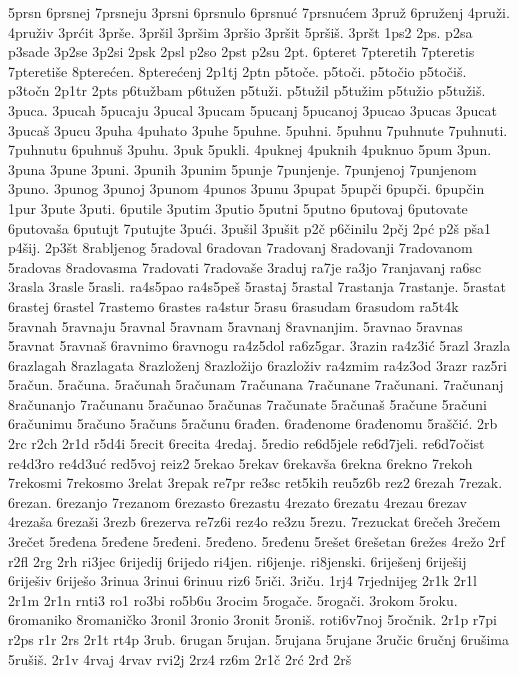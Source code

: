 {5prsn
6prsnej
7prsneju
3prsni
6prsnulo
6prsnuć
7prsnućem
3pruž
6pruženj
4pruži.
4pruživ
3prćit
3prše.
3pršil
3pršim
3pršio
3pršit
5pršiš.
3pršt
1ps2
2ps.
p2sa
p3sade
3p2se
3p2si
2psk
2psl
p2so
2pst
p2su
2pt.
6pteret
7pteretih
7pteretis
7pteretiše
8pterećen.
8pterećenj
2p1tj
2ptn
p5toče.
p5toči.
p5točio
p5točiš.
p3točn
2p1tr
2pts
p6tužbam
p6tužen
p5tuži.
p5tužil
p5tužim
p5tužio
p5tužiš.
3puca.
3pucah
5pucaju
3pucal
3pucam
5pucanj
5pucanoj
3pucao
3pucas
3pucat
3pucaš
3pucu
3puha
4puhato
3puhe
5puhne.
5puhni.
5puhnu
7puhnute
7puhnuti.
7puhnutu
6puhnuš
3puhu.
3puk
5pukli.
4puknej
4puknih
4puknuo
5pum
3pun.
3puna
3pune
3puni.
3punih
3punim
5punje
7punjenje.
7punjenoj
7punjenom
3puno.
3punog
3punoj
3punom
4punos
3punu
3pupat
5pupči
6pupči.
6pupčin
1pur
3pute
3puti.
6putile
3putim
3putio
5putni
5putno
6putovaj
6putovate
6putovaša
6putujt
7putujte
3pući.
3pušil
3pušit
p2č
p6činilu
2pčj
2pć
p2š
pša1
p4šij.
2p3št
8rabljenog
5radoval
6radovan
7radovanj
8radovanji
7radovanom
5radovas
8radovasma
7radovati
7radovaše
3raduj
ra7je
ra3jo
7ranjavanj
ra6sc
3rasla
3rasle
5rasli.
ra4s5pao
ra4s5peš
5rastaj
5rastal
7rastanja
7rastanje.
5rastat
6rastej
6rastel
7rastemo
6rastes
ra4stur
5rasu
6rasudam
6rasudom
ra5t4k
5ravnah
5ravnaju
5ravnal
5ravnam
5ravnanj
8ravnanjim.
5ravnao
5ravnas
5ravnat
5ravnaš
6ravnimo
6ravnogu
ra4z5dol
ra6z5gar.
3razin
ra4z3ić
5razl
3razla
6razlagah
8razlagata
8razloženj
8razložijo
6razloživ
ra4zmim
ra4z3od
3razr
raz5ri
5račun.
5računa.
5računah
5računam
7računana
7računane
7računani.
7računanj
8računanjo
7računanu
5računao
5računas
7računate
5računaš
5račune
5računi
6računimu
5računo
5računs
5računu
6rađen.
6rađenome
6rađenomu
5raščić.
2rb
2rc
r2ch
2r1d
r5d4i
5recit
6recita
4redaj.
5redio
re6d5jele
re6d7jeli.
re6d7očist
re4d3ro
re4d3uć
red5voj
reiz2
5rekao
5rekav
6rekavša
6rekna
6rekno
7rekoh
7rekosmi
7rekosmo
3relat
3repak
re7pr
re3sc
ret5kih
reu5z6b
rez2
6rezah
7rezak.
6rezan.
6rezanjo
7rezanom
6rezasto
6rezastu
4rezato
6rezatu
4rezau
6rezav
4rezaša
6rezaši
3rezb
6rezerva
re7z6i
rez4o
re3zu
5rezu.
7rezuckat
6rečeh
3rečem
3rečet
5ređena
5ređene
5ređeni.
5ređeno.
5ređenu
5rešet
6rešetan
6režes
4režo
2rf
r2fl
2rg
2rh
ri3jec
6rijedij
6rijedo
ri4jen.
ri6jenje.
ri8jenski.
6riješenj
6riješij
6riješiv
6riješo
3rinua
3rinui
6rinuu
riz6
5riči.
3riču.
1rj4
7rjednijeg
2r1k
2r1l
2r1m
2r1n
rnti3
ro1
ro3bi
ro5b6u
3rocim
5rogače.
5rogači.
3rokom
5roku.
6romaniko
8romaničko
3ronil
3ronio
3ronit
5roniš.
roti6v7noj
5ročnik.
2r1p
r7pi
r2ps
r1r
2rs
2r1t
rt4p
3rub.
6rugan
5rujan.
5rujana
5rujane
3ručic
6ručnj
6rušima
5rušiš.
2r1v
4rvaj
4rvav
rvi2j
2rz4
rz6m
2r1č
2rć
2rđ
2rš
}
